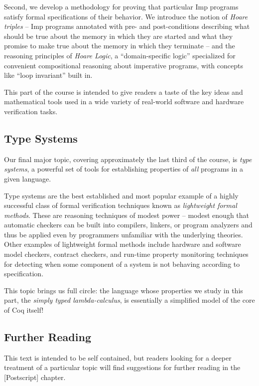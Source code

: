 Second, we develop a methodology for proving that particular Imp
programs satisfy formal specifications of their behavior. We introduce
the notion of \emph{Hoare triples} -- Imp programs annotated with pre-
and post-conditions describing what should be true about the memory in
which they are started and what they promise to make true about the
memory in which they terminate -- and the reasoning principles of
\emph{Hoare Logic}, a ``domain-specific logic'' specialized for
convenient compositional reasoning about imperative programs, with
concepts like ``loop invariant'' built in.

This part of the course is intended to give readers a taste of the key
ideas and mathematical tools used in a wide variety of real-world
software and hardware verification tasks.

\subsection{Type Systems}\label{type-systems}

Our final major topic, covering approximately the last third of the
course, is \emph{type systems}, a powerful set of tools for establishing
properties of \emph{all} programs in a given language.

Type systems are the best established and most popular example of a
highly successful class of formal verification techniques known as
\emph{lightweight formal methods}. These are reasoning techniques of
modest power -- modest enough that automatic checkers can be built into
compilers, linkers, or program analyzers and thus be applied even by
programmers unfamiliar with the underlying theories. Other examples of
lightweight formal methods include hardware and software model checkers,
contract checkers, and run-time property monitoring techniques for
detecting when some component of a system is not behaving according to
specification.

This topic brings us full circle: the language whose properties we study
in this part, the \emph{simply typed lambda-calculus}, is essentially a
simplified model of the core of Coq itself!

\subsection{Further Reading}\label{further-reading}

This text is intended to be self contained, but readers looking for a
deeper treatment of a particular topic will find suggestions for further
reading in the {[}Postscript{]} chapter.

